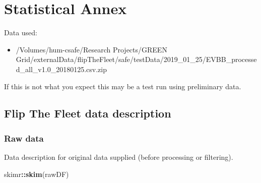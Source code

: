 \documentclass[]{article}
\newenvironment{Shaded}{\begin{snugshade}}{\end{snugshade}}
\newcommand{\KeywordTok}[1]{\textcolor[rgb]{0.13,0.29,0.53}{\textbf{#1}}}
\newcommand{\NormalTok}[1]{#1}
\newcommand{\OperatorTok}[1]{\textcolor[rgb]{0.81,0.36,0.00}{\textbf{#1}}}
\providecommand{\tightlist}{%
  \setlength{\itemsep}{0pt}\setlength{\parskip}{0pt}}
\begin{document}
\hypertarget{statistical-annex}{%
\section{Statistical Annex}\label{statistical-annex}}

Data used:

\begin{itemize}
\tightlist
\item
  /Volumes/hum-csafe/Research Projects/GREEN Grid/externalData/flipTheFleet/safe/testData/2019\_01\_25/EVBB\_processed\_all\_v1.0\_20180125.csv.zip
\end{itemize}

If this is not what you expect this may be a test run using preliminary data.

\hypertarget{flip-the-fleet-data-description}{%
\subsection{Flip The Fleet data description}\label{flip-the-fleet-data-description}}

\hypertarget{raw-data}{%
\subsubsection{Raw data}\label{raw-data}}

Data description for original data supplied (before processing or filtering).

\begin{Shaded}
\begin{Highlighting}[]
\NormalTok{skimr}\OperatorTok{::}\KeywordTok{skim}\NormalTok{(rawDF)}
\end{Highlighting}
\end{Shaded}
\end{document}
